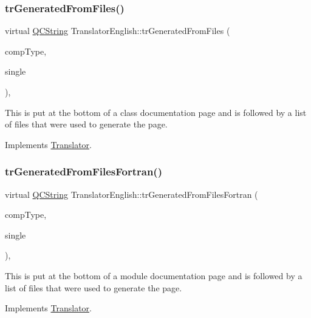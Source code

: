 \subsubsection{\texorpdfstring{trGeneratedFromFiles()}{trGeneratedFromFiles()}}
{\footnotesize\ttfamily virtual \mbox{\hyperlink{class_q_c_string}{Q\+C\+String}} Translator\+English\+::tr\+Generated\+From\+Files (\begin{DoxyParamCaption}\item[{\mbox{\hyperlink{class_class_def_ae70cf86d35fe954a94c566fbcfc87939}{Class\+Def\+::\+Compound\+Type}}}]{comp\+Type,  }\item[{bool}]{single }\end{DoxyParamCaption})\hspace{0.3cm}{\ttfamily [inline]}, {\ttfamily [virtual]}}

This is put at the bottom of a class documentation page and is followed by a list of files that were used to generate the page. 

Implements \mbox{\hyperlink{class_translator}{Translator}}.

\mbox{\label{class_translator_english_a352ceaaa0bea78aa367695a5e23ff42f}} 
\subsubsection{\texorpdfstring{trGeneratedFromFilesFortran()}{trGeneratedFromFilesFortran()}}
{\footnotesize\ttfamily virtual \mbox{\hyperlink{class_q_c_string}{Q\+C\+String}} Translator\+English\+::tr\+Generated\+From\+Files\+Fortran (\begin{DoxyParamCaption}\item[{\mbox{\hyperlink{class_class_def_ae70cf86d35fe954a94c566fbcfc87939}{Class\+Def\+::\+Compound\+Type}}}]{comp\+Type,  }\item[{bool}]{single }\end{DoxyParamCaption})\hspace{0.3cm}{\ttfamily [inline]}, {\ttfamily [virtual]}}

This is put at the bottom of a module documentation page and is followed by a list of files that were used to generate the page. 

Implements \mbox{\hyperlink{class_translator}{Translator}}.

